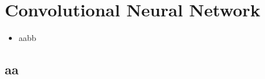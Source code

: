 \section{Convolutional Neural Network}

\begin{itemize}
  \item aabb
\end{itemize}

\subsection{aa}
